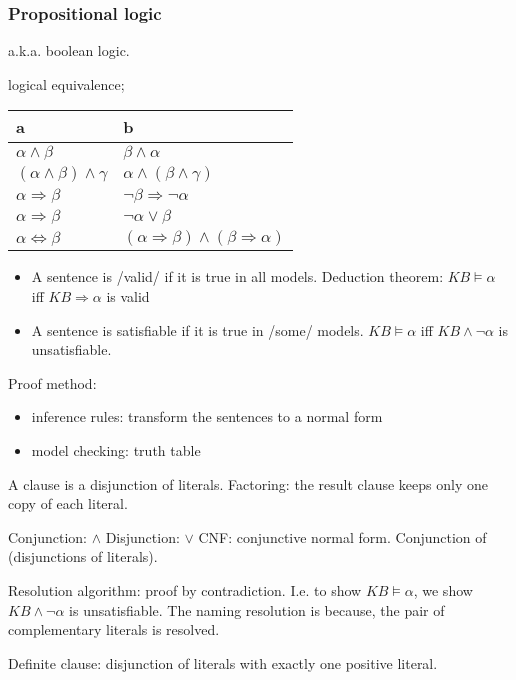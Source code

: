 \subsubsection{Propositional logic}
a.k.a. boolean logic.

logical equivalence;

\begin{tabular}{l|l}
  a                                   & b\\
  \hline
  $\alpha \wedge \beta$                 & $\beta \wedge \alpha$\\
  $(\alpha \wedge \beta) \wedge \gamma$ & $\alpha \wedge (\beta \wedge \gamma)$\\
  $\alpha \Rightarrow \beta$            & $\neg \beta \Rightarrow \neg \alpha$\\
  $\alpha \Rightarrow \beta$            & $\neg \alpha \vee \beta$\\
  $\alpha \Leftrightarrow \beta$        & $(\alpha \Rightarrow \beta) \wedge (\beta \Rightarrow \alpha)$
\end{tabular}

\begin{itemize}
\item A sentence is /valid/ if it is true in all models.
  Deduction theorem: $KB \models \alpha$ iff $KB \Rightarrow
  \alpha$ is valid
\item A sentence is satisfiable if it is true in /some/ models.
  $KB \models \alpha$ iff $KB \wedge \neg \alpha$ is unsatisfiable.
\end{itemize}

Proof method:
\begin{itemize}
\item inference rules: transform the sentences to a normal form
\item model checking: truth table
\end{itemize}

A clause is a disjunction of literals.
Factoring: the result clause keeps only one copy of each literal.

Conjunction: $\wedge$
Disjunction: $\vee$
CNF: conjunctive normal form. Conjunction of (disjunctions of literals).


Resolution algorithm: proof by contradiction.
I.e. to show $KB \models \alpha$, we show $KB \wedge \neg \alpha$ is unsatisfiable.
The naming resolution is because, the pair of complementary literals is resolved.

Definite clause: disjunction of literals with exactly one positive literal.


